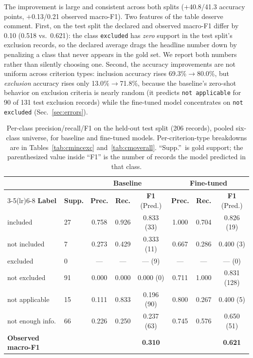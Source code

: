 \documentclass[conference]{IEEEtran}
\newcommand{\code}[1]{\texttt{\small #1}}
\begin{document}
The improvement is large and consistent across both splits
($+$40.8/41.3 accuracy points, $+$0.13/0.21 observed macro-F1).
Two features of the table deserve comment. First, on the test
split the declared and observed macro-F1 differ by 0.10
(0.518 vs.\ 0.621): the class \code{excluded} has \emph{zero}
support in the test split's exclusion records, so the declared
average drags the headline number down by penalizing a class
that never appears in the gold set. We report
both numbers rather than silently choosing one. Second, the
accuracy improvements are not uniform across criterion types:
inclusion accuracy rises 69.3\%$\to$80.0\%, but \emph{exclusion}
accuracy rises only 13.0\%$\to$71.8\%, because the
baseline's zero-shot behavior on exclusion criteria is nearly
random (it predicts \code{not applicable} for 90 of 131
test exclusion records) while the fine-tuned model concentrates
on \code{not excluded} (Sec.~\ref{sec:errors}).

\begin{table}[t]
\caption{Per-class precision/recall/F1 on the held-out test split
(206 records), pooled six-class universe, for baseline and
fine-tuned models. Per-criterion-type breakdowns are in
Tables~\ref{tab:cmincexc} and~\ref{tab:cmoverall}. ``Supp.''\ is
gold support; the parenthesized value inside ``F1'' is the number
of records the model predicted in that class.}
\label{tab:perclass}
\centering
\small
\begin{tabular}{llcccccc}
\toprule
 & & \multicolumn{3}{c}{\textbf{Baseline}} &
\multicolumn{3}{c}{\textbf{Fine-tuned}} \\
\cmidrule(lr){3-5}\cmidrule(lr){6-8}
\textbf{Label} & \textbf{Supp.} & \textbf{Prec.} & \textbf{Rec.} &
\textbf{F1} (Pred.) & \textbf{Prec.} & \textbf{Rec.} &
\textbf{F1} (Pred.) \\
\midrule
included & 27 & 0.758 & 0.926 & 0.833 (33) & 1.000 & 0.704 & 0.826 (19)\\
not included & 7 & 0.273 & 0.429 & 0.333 (11) & 0.667 & 0.286 & 0.400 (3)\\
excluded & 0 & --- & --- & --- (9) & --- & --- & --- (0)\\
not excluded & 91 & 0.000 & 0.000 & 0.000 (0) & 0.711 & 1.000 & 0.831 (128)\\
not applicable & 15 & 0.111 & 0.833 & 0.196 (90) & 0.800 & 0.267 & 0.400 (5)\\
not enough info. & 66 & 0.226 & 0.250 & 0.237 (63) & 0.745 & 0.576 & 0.650 (51)\\
\midrule
\textbf{Observed macro-F1} & & & & \textbf{0.310} & & &
\textbf{0.621}\\
\bottomrule
\end{tabular}
\end{table}
\end{document}
